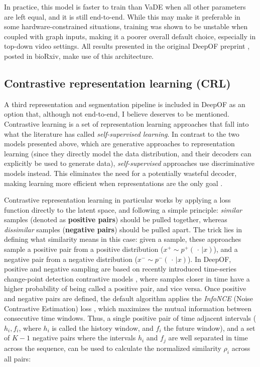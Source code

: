 In practice, this model is faster to train than VaDE when all other parameters are left equal, and it is still end-to-end. While this may make it preferable in some hardware-constrained situations, training was shown to be unstable when coupled with graph inputs, making it a poorer overall default choice, especially in top-down video settings. All results presented in the original DeepOF preprint \cite{Bordes2023AutomaticallyStress}, posted in bioRxiv, make use of this architecture.

\subsection{Contrastive representation learning (CRL)}

A third representation and segmentation pipeline is included in DeepOF as an option that, although not end-to-end, I believe deserves to be mentioned. Contrastive learning is a set of representation learning approaches that fall into what the literature has called \textit{self-supervised learning}. In contrast to the two models presented above, which are generative approaches to representation learning (since they directly model the data distribution, and their decoders can explicitly be used to generate data), \textit{self-supervised} approaches use discriminative models instead. This eliminates the need for a potentially wasteful decoder, making learning more efficient when representations are the only goal \cite{Le-Khac2020ContrastiveReview}. 

Contrastive representation learning in particular works by applying a loss function directly to the latent space, and following a simple principle: \textit{similar} samples (denoted as \textbf{positive pairs}) should be pulled together, whereas \textit{dissimilar} samples (\textbf{negative pairs}) should be pulled apart. The trick lies in defining what similarity means in this case: given a sample, these approaches sample a positive pair from a positive distribution ($x^{+} \sim p^{+}(\, \cdot\, | x)$), and a negative pair from a negative distribution ($x^{-} \sim p^{-}( \,\cdot\, | x)$). In DeepOF, positive and negative sampling are based on recently introduced time-series change-point detection contrastive models \cite{Deldari2021TimeCoding}, where samples closer in time have a higher probability of being called a positive pair, and vice versa. Once positive and negative pairs are defined, the default algorithm applies the \textit{InfoNCE} (Noise Contrastive Estimation) loss \cite{vandenOordDeepMind2019RepresentationCoding}, which maximizes the mutual information between consecutive time windows. Thus, a single positive pair of time adjacent intervals ($h_i, f_i$, where $h_i$ is called the history window, and $f_i$ the future window), and a set of $K - 1$ negative pairs where the intervals $h_i$ and $f_j$ are well separated in time across the sequence, can be used to calculate the normalized similarity $\rho_i$ across all pairs:

